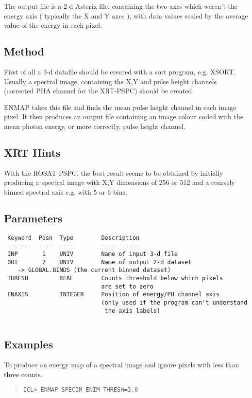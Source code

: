 \documentclass{book}
\renewcommand{\_}{{\tt\char'137}}     %
\begin{document}
The output file is a 2-d Asterix file, containing the two axes which
weren't the energy axis ( typically the X and Y axes ), with data values
scaled by the average value of the energy in each pixel.
 
\subsection{Method}
First of all a 3-d datafile should be created with a sort program,
e.g. XSORT. Usually a spectral image, containing the X,Y and pulse
height channels (corrected PHA channel for the XRT-PSPC) should be
created.
 
ENMAP takes this file and finds the mean pulse height channel in each
image pixel. It then produces an output file containing an image colour
coded with the mean photon energy, or more correctly, pulse height
channel.
 
\subsection{XRT Hints}
With the ROSAT PSPC, the best result seems to be obtained by initially
producing a spectral image with X,Y dimensions of 256 or 512 and
a coarsely binned spectral axis e.g. with 5 or 6 bins.
 
\subsection{Parameters}
\begin{verbatim}
 Keyword  Posn  Type        Description
 -------  ----  ----        -----------
 INP       1    UNIV        Name of input 3-d file
 OUT       2    UNIV        Name of output 2-d dataset
    -> GLOBAL.BINDS (the current binned dataset)
 THRESH         REAL        Counts threshold below which pixels
                            are set to zero
 ENAXIS         INTEGER     Position of energy/PH channel axis
                            (only used if the program can't understand
                             the axis labels)
 
\end{verbatim}\subsection{Examples}
To produce an energy map of a spectral image and ignore pixels with
less than three counts.
 
\begin{quote}\begin{verbatim}
ICL> ENMAP SPECIM ENIM THRESH=3.0
\end{verbatim}\end{quote}
\end{document}
